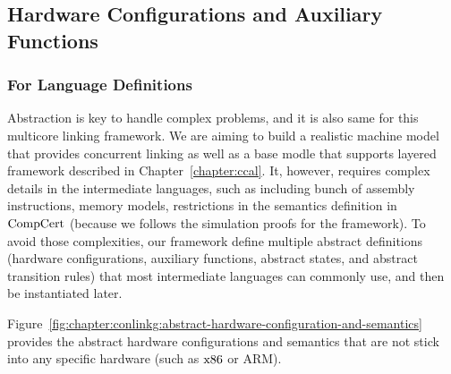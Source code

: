 \subsection{Hardware Configurations and Auxiliary Functions}
\label{chapter:linking:subsec:hardware-configuration}

\subsubsection{For Language Definitions}

Abstraction is key to handle complex problems, and it is also same for this multicore linking framework.
We are aiming to build a realistic machine model that provides 
concurrent linking as well as a base modle that supports 
layered framework described in Chapter~\ref{chapter:ccal}.
It, however, requires complex details in the intermediate languages, 
such as including bunch of assembly instructions, memory models, 
restrictions in the semantics definition in $\mathrm{CompCert}$ (because we follows 
the simulation proofs for the framework).
To avoid those complexities, 
our framework define multiple abstract definitions (hardware configurations, auxiliary functions, 
abstract states, and abstract transition rules)
that most intermediate languages can commonly use, 
and then be instantiated later. 


Figure~\ref{fig:chapter:conlinkg:abstract-hardware-configuration-and-semantics} provides the 
abstract hardware configurations and semantics that are
not stick into any specific hardware (such as $\mathrm{x86}$ or ARM). 

